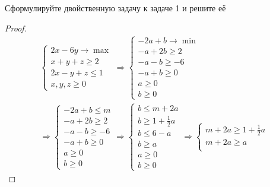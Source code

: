 \vskip 0.6in




\begin{prob}
    Сформулируйте двойственную задачу к задаче 1 и решите её
\end{prob}

\begin{proof}
    \begin{gather*}
        \begin{cases}
            2x - 6y \to \max\\
            x + y + z \geqslant 2\\
            2x - y + z \leqslant 1\\
            x,y,z \geqslant 0
        \end{cases}
        \Rightarrow
        \begin{cases}
            -2a + b \to \min\\
            -a + 2b \geqslant 2\\
            -a - b \geqslant -6\\
            -a + b \geqslant 0\\
            a \geqslant 0\\
            b \geqslant 0
        \end{cases}\\
        \Rightarrow
        \begin{cases}
            -2a + b \leqslant m\\
            -a + 2b \geqslant 2\\
            -a - b \geqslant -6\\
            -a + b \geqslant 0\\
            a \geqslant 0\\
            b \geqslant 0
        \end{cases}
        \Rightarrow
        \begin{cases}
            b \leqslant m + 2a\\
            b \geqslant 1 + \frac{1}{2}a\\
            b \leqslant 6 - a\\
            b \geqslant a\\
            a \geqslant 0\\
            b \geqslant 0
        \end{cases}
        \Rightarrow
        \begin{cases}
            m + 2a \geqslant 1 + \frac{1}{2}a\\
            m + 2a \geqslant a\\

\end{cases}
\end{gather*}
\end{proof}
